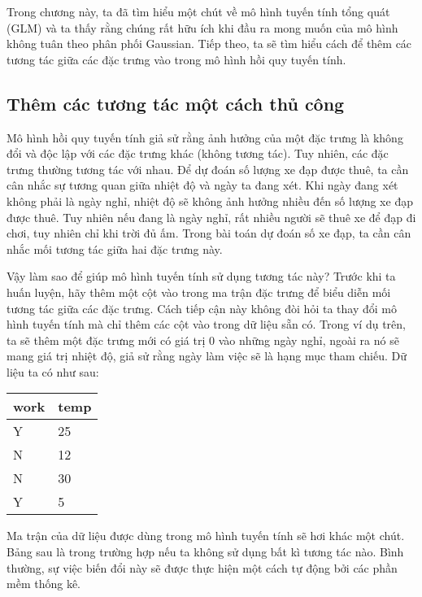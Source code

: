 Trong chương này, ta đã tìm hiểu một chút về mô hình tuyến tính tổng quát (GLM) và ta thấy rằng chúng rất hữu ích khi đầu ra mong muốn của mô hình không tuân theo phân phối Gaussian. Tiếp theo, ta sẽ tìm hiểu cách để thêm các tương tác giữa các đặc trưng vào trong mô hình hồi quy tuyến tính.

\subsection{Thêm các tương tác một cách thủ công}
\label{Interactions}
Mô hình hồi quy tuyến tính giả sử rằng ảnh hưởng của một đặc trưng là không đổi và độc lập với các đặc trưng khác (không tương tác). Tuy nhiên, các đặc trưng thường tương tác với nhau. Để dự đoán số lượng xe đạp được thuê, ta cần cân nhắc sự tương quan giữa nhiệt độ và ngày ta đang xét. Khi ngày đang xét không phải là ngày nghỉ, nhiệt độ sẽ không ảnh hưởng nhiều đến số lượng xe đạp được thuê. Tuy nhiên nếu đang là ngày nghỉ, rất nhiều người sẽ thuê xe để đạp đi chơi, tuy nhiên chỉ khi trời đủ ấm. Trong bài toán dự đoán số xe đạp, ta cần cân nhắc mối tương tác giữa hai đặc trưng này.

Vậy làm sao để giúp mô hình tuyến tính sử dụng tương tác này? Trước khi ta huấn luyện, hãy thêm một cột vào trong ma trận đặc trưng để biểu diễn mối tương tác giữa các đặc trưng. Cách tiếp cận này không đòi hỏi ta thay đổi mô hình tuyến tính mà chỉ thêm các cột vào trong dữ liệu sẵn có. Trong ví dụ trên, ta sẽ thêm một đặc trưng mới có giá trị 0 vào những ngày nghỉ, ngoài ra nó sẽ mang giá trị nhiệt độ, giả sử rằng ngày làm việc sẽ là hạng mục tham chiếu. Dữ liệu ta có như sau:

\begin{table*}[!hbt]
\centering
\begin{tabular}{|l|l|}
\hline
work & temp \\ \hline
Y    & 25   \\ \hline
N    & 12   \\ \hline
N    & 30   \\ \hline
Y    & 5    \\ \hline
\end{tabular}
\end{table*}

Ma trận của dữ liệu được dùng trong mô hình tuyến tính sẽ hơi khác một chút. Bảng sau là trong trường hợp nếu ta không sử dụng bất kì tương tác nào. Bình thường, sự việc biến đổi này sẽ được thực hiện một cách tự động bởi các phần mềm thống kê.


